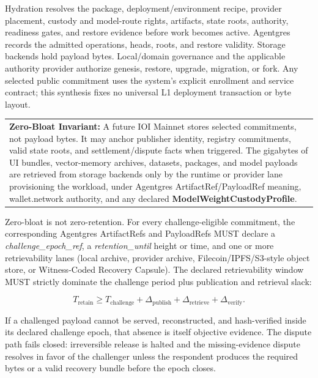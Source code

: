 \documentclass[
  11pt,
]{article}
\begin{document}
Hydration resolves the package, deployment/environment recipe, provider
placement, custody and model-route rights, artifacts, state roots, authority,
readiness gates, and restore evidence before work becomes active. Agentgres
records the admitted operations, heads, roots, and restore validity. Storage
backends hold payload bytes. Local/domain governance and the applicable
authority provider authorize genesis, restore, upgrade, migration, or fork.
Any selected public commitment uses the system's explicit enrollment and
service contract; this synthesis fixes no universal L1 deployment transaction
or byte layout.

\begin{longtable}[]{@{}>{\raggedright\arraybackslash}p{\linewidth}@{}}
\toprule\noalign{}
 \\
\midrule\noalign{}
\endhead
\bottomrule\noalign{}
\endlastfoot
\textbf{Zero-Bloat Invariant:}\emph{\textbf{ }}A future IOI Mainnet
stores selected commitments, not payload bytes. It may
anchor publisher identity, registry commitments, valid state roots, and
settlement/dispute facts when triggered. The gigabytes of UI bundles,
vector-memory archives, datasets, packages, and model payloads are
retrieved from storage backends only by the runtime or provider lane
provisioning the workload, under Agentgres ArtifactRef/PayloadRef meaning,
wallet.network authority, and any declared \textbf{ModelWeightCustodyProfile}. \\
\end{longtable}

Zero-bloat is not zero-retention. For every challenge-eligible
commitment, the corresponding Agentgres ArtifactRefs and PayloadRefs
MUST declare a \emph{challenge\_epoch\_ref}, a \emph{retention\_until}
height or time, and one or more retrievability lanes (local archive,
provider archive, Filecoin/IPFS/S3-style object store, or
Witness-Coded Recovery Capsule). The declared retrievability window MUST
strictly dominate the challenge period plus publication and retrieval
slack:

\[
T_{\mathrm{retain}} \geq
T_{\mathrm{challenge}} + \Delta_{\mathrm{publish}} +
\Delta_{\mathrm{retrieve}} + \Delta_{\mathrm{verify}}.
\]

If a challenged payload cannot be served, reconstructed, and hash-verified
inside its declared challenge epoch, that absence is itself objective
evidence. The dispute path fails closed: irreversible release is halted
and the missing-evidence dispute resolves in favor of the challenger
unless the respondent produces the required bytes or a valid recovery
bundle before the epoch closes.
\end{document}
